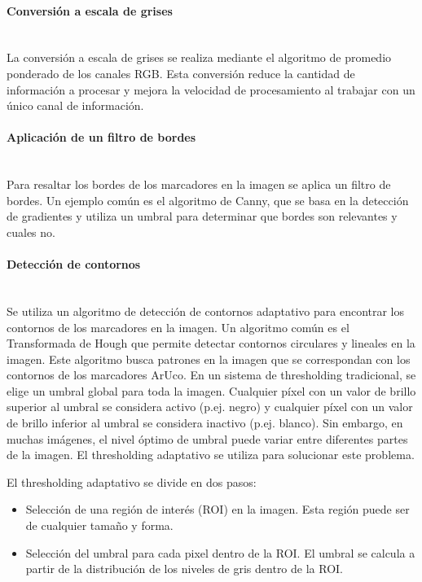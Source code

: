 \paragraph{Conversión a escala de grises}~\\
La conversión a escala de grises se realiza mediante el algoritmo de promedio ponderado de los canales RGB. Esta conversión reduce la cantidad de información a procesar y mejora la velocidad de procesamiento al trabajar con un único canal de información.
\paragraph{Aplicación de un filtro de bordes}~\\
Para resaltar los bordes de los marcadores en la imagen se aplica un filtro de bordes. Un ejemplo común es el algoritmo de Canny, que se basa en la detección de gradientes y utiliza un umbral para determinar que bordes son relevantes y cuales no.
\paragraph{Detección de contornos}~\\
Se utiliza un algoritmo de detección de contornos adaptativo para encontrar los contornos de los marcadores en la imagen. Un algoritmo común es el Transformada de Hough que permite detectar contornos circulares y lineales en la imagen. Este algoritmo busca patrones en la imagen que se correspondan con los contornos de los marcadores ArUco.
En un sistema de thresholding tradicional, se elige un umbral global para toda la imagen. Cualquier píxel con un valor de brillo superior al umbral se considera activo (p.ej. negro) y cualquier píxel con un valor de brillo inferior al umbral se considera inactivo (p.ej. blanco). Sin embargo, en muchas imágenes, el nivel óptimo de umbral puede variar entre diferentes partes de la imagen. El thresholding adaptativo se utiliza para solucionar este problema.

El thresholding adaptativo se divide en dos pasos:
\begin{itemize}
\item Selección de una región de interés (ROI) en la imagen. Esta región puede ser de cualquier tamaño y forma.
\item Selección del umbral para cada pixel dentro de la ROI. El umbral se calcula a partir de la distribución de los niveles de gris dentro de la ROI.
\end{itemize}

